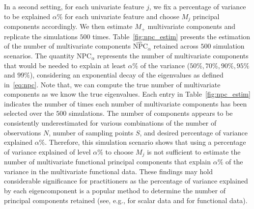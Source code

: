 \documentclass{article}
\newcounter{th}
\newcounter{scenario}[section]
\begin{document}
In a second setting, for each univariate feature $j$, we fix a percentage of variance to be explained $\alpha\%$ for each univariate feature and choose $M_j$ principal components accordingly. We then estimate $M_+$ multivariate components and replicate the simulations $500$ times. Table~\ref{fig:npc_estim} presents the estimation of the number of multivariate components $\widehat{\text{NPC}}_{\alpha}$ retained across $500$ simulation scenarios. The quantity $\text{NPC}_{\alpha}$ represents the number of multivariate components that would be needed to explain at least $\alpha\%$ of the variance ($50\%, 70\%, 90\%, 95\%$ and $99\%$), considering an exponential decay of the eigenvalues as defined in~\eqref{eq:npc}. Note that, we can compute the true number of multivariate components as we know the true eigenvalues. Each entry in Table~\ref{fig:npc_estim} indicates the number of times each number of multivariate components has been selected over the $500$ simulations. The number of components appears to be consistently underestimated for various combinations of the number of observations $N$, number of sampling points $S$, and desired percentage of variance explained $\alpha\%$. Therefore, this simulation scenario shows that using a percentage of variance explained of level $\alpha\%$ to choose $M_j$ is not sufficient to estimate the number of multivariate functional principal components that explain $\alpha\%$ of the variance in the multivariate functional data. These findings may hold considerable significance for practitioners as the percentage of variance explained by each eigencomponent is a popular method to determine the number of principal components retained (see, e.g., \cite{jamesIntroductionStatisticalLearning2021} for scalar data and \cite{horvathInferenceFunctionalData2012a} for functional data).
\end{document}
